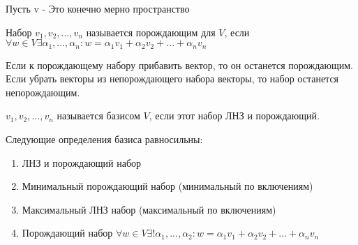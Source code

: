 

Пусть v - Это конечно мерно пространство

\begin{definition}
    Набор $v_1, v_2, ..., v_n$ называется порождающим для $V$,
    если $\forall w \in V \exists \alpha_1,..., \alpha_n : w =
        \alpha_1 v_1 + \alpha_2 v_2 + ... + \alpha_n v_n$
\end{definition}

\begin{remark}
    Если к порождающему набору прибавить вектор, то он останется порождающим.
    Если убрать векторы из непорождающего набора векторы, то набор останется непорождающим.
\end{remark}


\begin{definition}
    $v_1, v_2, ..., v_n$ называется базисом $V$, если этот набор ЛНЗ и порождающий.
\end{definition}
\begin{theorem}[О базисе]
    Следующие определения базиса равносильны:
    \begin{enumerate}
        \item ЛНЗ и  порождающий набор
        \item Минимальный порождающий набор (минимальный по включениям)
        \item Максимальный ЛНЗ набор (максимальный по включениям)
        \item Порождающий набор $\forall w \in V \exists! \alpha_1, ..., \alpha_2:
                  w = \alpha_1 v_1 + \alpha_2 v_2 + ... + \alpha_n v_n$
    \end{enumerate}
\end{theorem}

